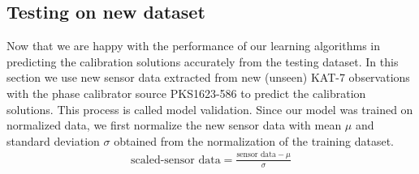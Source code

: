 \begin{table}[H]
\label{T:equipos}
\begin{center}
\end{center}
\caption{The table shows the performance of the Extremely randomized tree algorithm in predicting the amplitude and phase gain solutions for both h and v polarizations. The values shown represents the uniform average of all KAT-7 antennas, i.e, all outputs measures are averaged with uniform weight. Majority of the predictions stay near the ideal truth values with rmse \ref{MSE} and rmae \ref{MAE}  $\approx <$ 0.5, $R^2$ \ref{R2score} and explained variance $V$ \ref{ExV} are converging to 1.}
\end{table}

\subsection{Testing on new dataset}

Now that we are happy with the performance of our learning algorithms in predicting the calibration solutions accurately from the testing dataset. In this section we use new sensor data extracted from new (unseen) KAT-7 observations with the phase calibrator source PKS1623-586 to predict the calibration solutions. This process is called model validation. Since our model was trained on normalized data, we first normalize the new sensor data with mean $\mu$ and standard deviation $\sigma$ obtained from the normalization of the training dataset.
\begin{align}
\text{scaled-sensor data}= \frac{\text{sensor data}- \mu}{\sigma}
\end{align}

